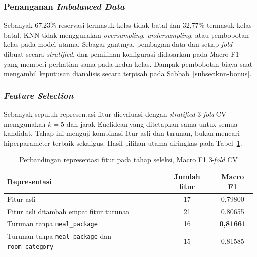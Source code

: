 \subsubsection{Penanganan \textit{Imbalanced Data}}
Sebanyak 67,23\% reservasi termasuk kelas tidak batal dan 32,77\% termasuk kelas batal. KNN tidak menggunakan \textit{oversampling}, \textit{undersampling}, atau pembobotan kelas pada model utama. Sebagai gantinya, pembagian data dan setiap \textit{fold} dibuat secara \textit{stratified}, dan pemilihan konfigurasi didasarkan pada Macro F1 yang memberi perhatian sama pada kedua kelas. Dampak pembobotan biaya saat mengambil keputusan dianalisis secara terpisah pada Subbab~\ref{subsec:knn-bonus}.

\subsubsection{\textit{Feature Selection}}
Sebanyak sepuluh representasi fitur dievaluasi dengan \textit{stratified} 3-\textit{fold} CV menggunakan $k=5$ dan jarak Euclidean yang ditetapkan sama untuk semua kandidat. Tahap ini menguji kombinasi fitur asli dan turunan, bukan mencari hiperparameter terbaik sekaligus. Hasil pilihan utama diringkas pada Tabel~\ref{tab:knn-fs}.

\begin{table}[H]
 \centering
 \caption{Perbandingan representasi fitur pada tahap seleksi, Macro F1 3-\textit{fold} CV}
 \label{tab:knn-fs}
 \begin{tabular}{l c c}
  \toprule
  \textbf{Representasi} & \textbf{Jumlah fitur} & \textbf{Macro F1} \\
  \midrule
  Fitur asli & 17 & 0,79800 \\
  Fitur asli ditambah empat fitur turunan & 21 & 0,80655 \\
  Turunan tanpa \texttt{meal\_package} & 16 & \textbf{0,81661} \\
  Turunan tanpa \texttt{meal\_package} dan \texttt{room\_category} & 15 & 0,81585 \\
  \bottomrule
 \end{tabular}
\end{table}

